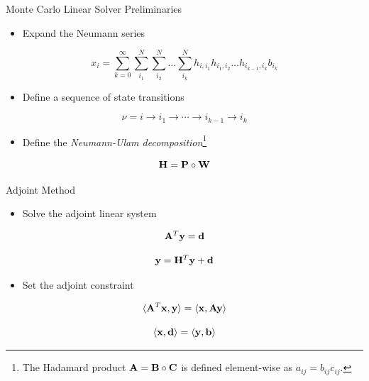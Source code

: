 \documentclass{beamer}
\begin{document}
\begin{frame}{Monte Carlo Linear Solver Preliminaries}

  \begin{itemize}
  \item Expand the Neumann series
  \end{itemize}

  \[
  x_i = \sum_{k=0}^{\infty}\sum_{i_1}^{N}\sum_{i_2}^{N}\ldots
  \sum_{i_k}^{N}h_{i,i_1}h_{i_1,i_2}\ldots h_{i_{k-1},i_k}b_{i_k}
  \]

  \medskip
  \begin{itemize}
  \item Define a sequence of state transitions
  \end{itemize}
  
  \[
  \nu = i \rightarrow i_1 \rightarrow \cdots \rightarrow i_{k-1}
  \rightarrow i_{k}
  \]

  \medskip
  \begin{itemize}
  \item Define the \textit{Neumann-Ulam decomposition}\footnote{The
    Hadamard product $\mathbf{A} = \mathbf{B} \circ \mathbf{C}$ is defined
    element-wise as $a_{ij} = b_{ij} c_{ij}$.}
  \end{itemize}

  \[
  \mathbf{H} = \mathbf{P} \circ \mathbf{W}
  \]

\end{frame}

\begin{frame}{Adjoint Method}

  \begin{itemize}
  \item Solve the adjoint linear system
  \end{itemize}

  \[
  \mathbf{A}^T \mathbf{y} = \mathbf{d}
  \]

  \[
  \mathbf{y} = \mathbf{H}^T \mathbf{y} + \mathbf{d}
  \]

  \medskip
  \begin{itemize}
  \item Set the adjoint constraint
  \end{itemize}

  \[
  \langle \mathbf{A}^T \mathbf{x}, \mathbf{y} \rangle = \langle \mathbf{x}, \mathbf{A}
  \mathbf{y} \rangle
  \]

  \[
  \langle \mathbf{x}, \mathbf{d} \rangle = \langle \mathbf{y}, \mathbf{b} \rangle
  \]
  
\end{frame}
\end{document}

